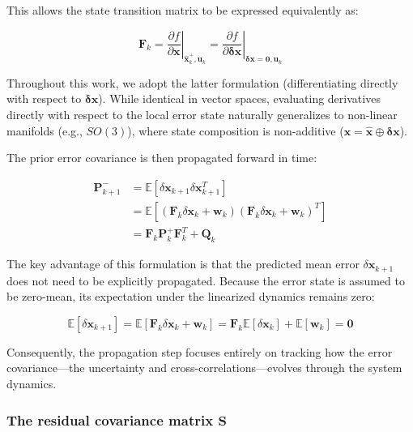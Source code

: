 \documentclass{article}
\begin{document}
	This allows the state transition matrix to be expressed equivalently as:
	
	\begin{equation*}
		\mathbf{F}_k = \left. \frac{\partial f}{\partial \mathbf{x}} \right|_{\hat{\mathbf{x}}_k^+, \mathbf{u}_k} = \left. \frac{\partial f}{\partial \boldsymbol{\delta\mathbf{x}}} \right|_{\boldsymbol{\delta\mathbf{x}} = \mathbf{0}, \mathbf{u}_k}
	\end{equation*}
	
	Throughout this work, we adopt the latter formulation (differentiating directly with respect to $\boldsymbol{\delta\mathbf{x}}$). While identical in vector spaces, evaluating derivatives directly with respect to the local error state naturally generalizes to non-linear manifolds (e.g., $SO(3)$), where state composition is non-additive ($\mathbf{x} = \hat{\mathbf{x}} \oplus \boldsymbol{\delta\mathbf{x}}$).
	
	The prior error covariance is then propagated forward in time:
	
	\begin{align}
		\mathbf{P}_{k+1}^- &= \mathbb{E}\left[ \delta\mathbf{x}_{k+1} \delta\mathbf{x}_{k+1}^T \right] \nonumber \\
		&= \mathbb{E}\left[ (\mathbf{F}_k \delta\mathbf{x}_k + \mathbf{w}_k)(\mathbf{F}_k \delta\mathbf{x}_k + \mathbf{w}_k)^T \right] \nonumber \\
		&= \mathbf{F}_k \mathbf{P}_k^+ \mathbf{F}_k^T + \mathbf{Q}_k
	\end{align}
	
	The key advantage of this formulation is that the predicted mean error $\delta\mathbf{x}_{k+1}$ does not need to be explicitly propagated. Because the error state is assumed to be zero-mean, its expectation under the linearized dynamics remains zero:
	
	\begin{equation}
		\mathbb{E}[\delta\mathbf{x}_{k+1}] = \mathbb{E}[\mathbf{F}_k \delta\mathbf{x}_k + \mathbf{w}_k] = \mathbf{F}_k \mathbb{E}[\delta\mathbf{x}_k] + \mathbb{E}[\mathbf{w}_k] = \mathbf{0}
	\end{equation}
	
	Consequently, the propagation step focuses entirely on tracking how the error covariance—the uncertainty and cross-correlations—evolves through the system dynamics.
	
	\subsubsection{The residual covariance matrix $\mathbf{S}$}
	
\end{document}

